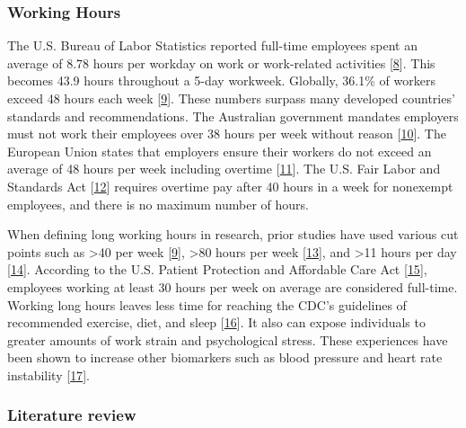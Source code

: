\documentclass[]{elsarticle} %
\begin{document}
\hypertarget{working-hours}{%
\subsubsection{Working Hours}\label{working-hours}}

The U.S. Bureau of Labor Statistics reported full-time employees spent
an average of 8.78 hours per workday on work or work-related activities
{[}\protect\hyperlink{ref-bls2019}{8}{]}. This becomes 43.9 hours
throughout a 5-day workweek. Globally, 36.1\% of workers exceed 48 hours
each week {[}\protect\hyperlink{ref-rivera2020}{9}{]}. These numbers
surpass many developed countries' standards and recommendations. The
Australian government mandates employers must not work their employees
over 38 hours per week without reason
{[}\protect\hyperlink{ref-reynolds2018}{10}{]}. The European Union
states that employers ensure their workers do not exceed an average of
48 hours per week including overtime
{[}\protect\hyperlink{ref-euro2021}{11}{]}. The U.S. Fair Labor and
Standards Act {[}\protect\hyperlink{ref-flsa1938}{12}{]} requires
overtime pay after 40 hours in a week for nonexempt employees, and there
is no maximum number of hours.

When defining long working hours in research, prior studies have used
various cut points such as \textgreater40 per week
{[}\protect\hyperlink{ref-rivera2020}{9}{]}, \textgreater80 hours per
week {[}\protect\hyperlink{ref-lee2016}{13}{]}, and \textgreater11 hours
per day {[}\protect\hyperlink{ref-lemke2017}{14}{]}. According to the
U.S. Patient Protection and Affordable Care Act
{[}\protect\hyperlink{ref-ppaca2010}{15}{]}, employees working at least
30 hours per week on average are considered full-time. Working long
hours leaves less time for reaching the CDC's guidelines of recommended
exercise, diet, and sleep
{[}\protect\hyperlink{ref-artazcoz2009}{16}{]}. It also can expose
individuals to greater amounts of work strain and psychological stress.
These experiences have been shown to increase other biomarkers such as
blood pressure and heart rate instability
{[}\protect\hyperlink{ref-kivimaki2018}{17}{]}.

\hypertarget{literature-review}{%
\subsubsection{Literature review}\label{literature-review}}
\end{document}
